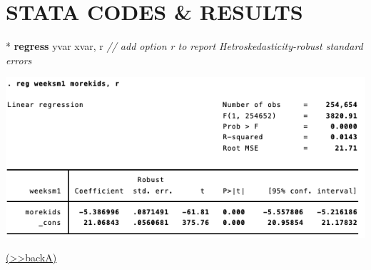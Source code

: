 \documentclass[
  10pt,
  ignorenonframetext,
]{beamer}
\newenvironment{Shaded}{\begin{snugshade}}{\end{snugshade}}
\newcommand{\CommentTok}[1]{\textcolor[rgb]{0.56,0.35,0.01}{\textit{#1}}}
\newcommand{\FunctionTok}[1]{\textcolor[rgb]{0.00,0.00,0.00}{#1}}
\newcommand{\KeywordTok}[1]{\textcolor[rgb]{0.13,0.29,0.53}{\textbf{#1}}}
\newcommand{\NormalTok}[1]{#1}
\begin{document}
\hypertarget{stata-codes-results}{%
\section{STATA CODES \& RESULTS}\label{stata-codes-results}}

\begin{frame}[fragile]{}
\protect\hypertarget{res1-regOLS}{}
\small

\begin{Shaded}
\begin{Highlighting}[]
\NormalTok{* }\KeywordTok{regress}\NormalTok{ yvar xvar, }\FunctionTok{r}
\CommentTok{// add option r to report Hetroskedasticity{-}robust standard errors}
\end{Highlighting}
\end{Shaded}

\begin{center}\includegraphics[width=1\linewidth]{pictures/res1-regOLS} \end{center}

\footnotesize \protect\hyperlink{q1-regOLS}{(\textgreater\textgreater backA)}
\normalsize
\end{frame}
\end{document}
